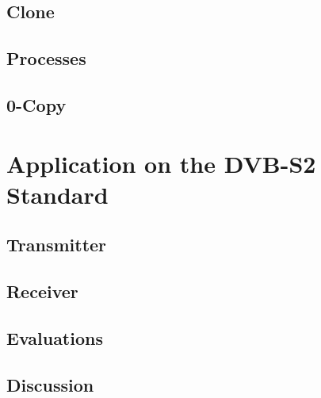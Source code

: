 \subsection{Clone}

\subsection{Processes}

\subsection{0-Copy}

\section{Application on the DVB-S2 Standard}

\subsection{Transmitter}

\subsection{Receiver}

\subsection{Evaluations}

\subsection{Discussion}
